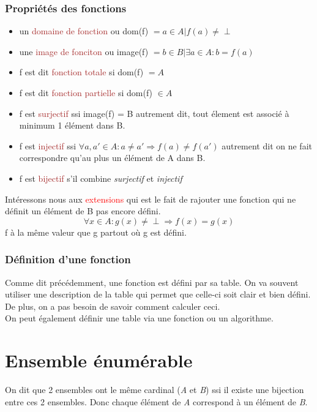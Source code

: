 \documentclass{report}
\begin{document}
\subsubsection{Propriétés des fonctions}
\begin{itemize}
\item un \textcolor{brown}{domaine de fonction} ou dom(f) $= {a \in A | f(a) \neq \perp}$
\item une \textcolor{brown}{image de fonciton} ou image(f) $= b \in B | \exists a \in A: b = f(a)$
\item f est dit \textcolor{brown}{fonction totale} si dom(f) $= A$
\item f est dit \textcolor{brown}{fonction partielle} si dom(f) $\in A$ %
\item f est \textcolor{brown}{surjectif} ssi image(f) = B autrement dit, tout élement est associé à minimum 1 élément dans B.
\item f est \textcolor{brown}{injectif} ssi $\forall a, a' \in A: a \neq a' \Rightarrow f(a)\neq f(a')$ autrement dit on ne fait correspondre qu'au plus un élément de A dans B.
\item f est \textcolor{brown}{bijectif} s'il combine \textit{surjectif} et \textit{injectif}
\end{itemize}

Intéressons nous aux \textcolor{red}{extensions} qui est le fait de rajouter une fonction qui ne définit un élément de B pas encore défini.
\begin{equation}
\forall x \in A : g(x) \neq \perp \Rightarrow f(x) = g(x)
\end{equation}	
f à la même valeur que g partout où g est défini.

\subsubsection{Définition d'une fonction}
Comme dit précédemment, une fonction est défini par sa table. On va souvent utiliser une description de la table qui permet que celle-ci soit clair et bien défini. De plus, on a pas besoin de savoir comment calculer ceci.\\
On peut également définir une table via une fonction ou un algorithme.

\section{Ensemble énumérable}
On dit que 2 ensembles ont le même cardinal (\textit{A} et \textit{B}) ssi il existe une bijection entre ces 2 ensembles. Donc chaque élément de \textit{A} correspond à un élément de \textit{B}.\\
\end{document}
